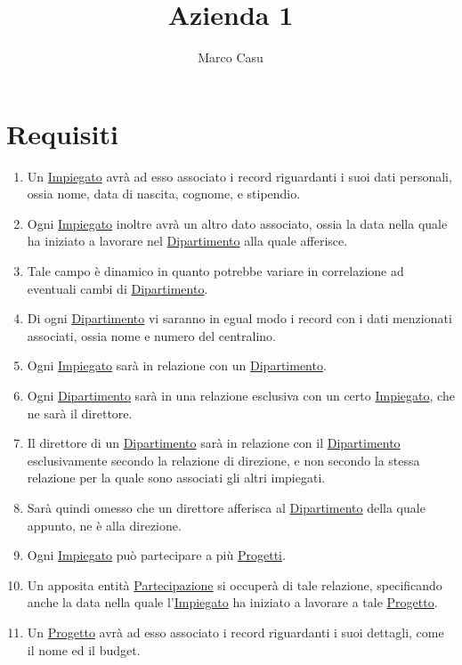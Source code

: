 \documentclass[12pt, letterpaper]{article}
\title{Azienda 1}
\author{Marco Casu}
\date{\vspace{-5ex}}
\begin{document}
\maketitle
\begin{figure}[h]
    \centering{
    
    }
\end{figure}
\section{Requisiti}
\begin{enumerate}
    \item Un \underline{Impiegato} avrà ad esso associato i record riguardanti i suoi 
    dati personali, ossia nome, data di nascita, cognome, e stipendio.
    \item Ogni \underline{Impiegato} inoltre avrà un altro dato associato, ossia la data nella 
    quale ha iniziato a lavorare nel \underline{Dipartimento} alla quale afferisce.
    \item Tale campo è dinamico in quanto potrebbe variare in correlazione ad eventuali 
    cambi di \underline{Dipartimento}.
    \item Di ogni \underline{Dipartimento} vi saranno in egual modo i record con i dati menzionati 
    associati, ossia nome e numero del centralino.
    \item Ogni \underline{Impiegato} sarà in relazione con un \underline{Dipartimento}.
    \item Ogni \underline{Dipartimento} sarà in una relazione esclusiva con un certo 
    \underline{Impiegato}, che ne sarà il direttore. 
    \item Il direttore di un \underline{Dipartimento} sarà in relazione con il 
    \underline{Dipartimento} esclusivamente secondo la relazione di direzione, e non 
    secondo la stessa relazione per la quale sono associati gli altri impiegati.
    \item Sarà quindi omesso che un direttore afferisca al \underline{Dipartimento}
    della quale appunto, ne è alla direzione.
    \item Ogni \underline{Impiegato} può partecipare a più \underline{Progetti}. 
    \item Un apposita entità \underline{Partecipazione} si occuperà di tale relazione, specificando 
    anche la data nella quale l'\underline{Impiegato} ha iniziato a lavorare a tale 
    \underline{Progetto}.
    \item Un \underline{Progetto} avrà ad esso associato i record riguardanti i suoi 
    dettagli, come il nome ed il budget.
\end{enumerate}
\newpage
\end{document}
